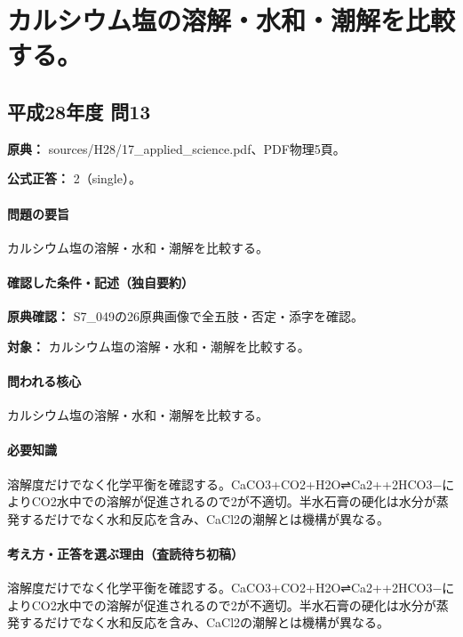 \section{カルシウム塩の溶解・水和・潮解を比較する。}

\subsection{平成28年度 問13}
\label{q:h28-reg-applied-13}

\noindent\textbf{原典：} sources/H28/17\_applied\_science.pdf、PDF物理5頁。

\textbf{公式正答：} 2（single）。

\paragraph{問題の要旨} カルシウム塩の溶解・水和・潮解を比較する。

\paragraph{確認した条件・記述（独自要約）}\mbox{}\par

\noindent\textbf{原典確認：} S7\_049の26原典画像で全五肢・否定・添字を確認。\par

\noindent\textbf{対象：} カルシウム塩の溶解・水和・潮解を比較する。\par

\paragraph{問われる核心} カルシウム塩の溶解・水和・潮解を比較する。

\paragraph{必要知識} 溶解度だけでなく化学平衡を確認する。CaCO3+CO2+H2O⇌Ca2++2HCO3−によりCO2水中での溶解が促進されるので2が不適切。半水石膏の硬化は水分が蒸発するだけでなく水和反応を含み、CaCl2の潮解とは機構が異なる。

\paragraph{考え方・正答を選ぶ理由（査読待ち初稿）} 溶解度だけでなく化学平衡を確認する。CaCO3+CO2+H2O⇌Ca2++2HCO3−によりCO2水中での溶解が促進されるので2が不適切。半水石膏の硬化は水分が蒸発するだけでなく水和反応を含み、CaCl2の潮解とは機構が異なる。

